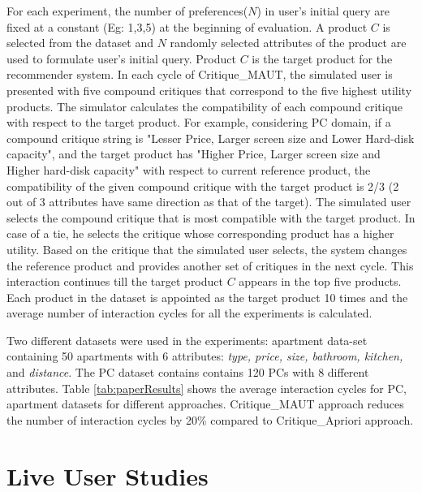 For each experiment, the number of preferences($N$) in user's initial query are fixed at a constant (Eg: 1,3,5) at the beginning of evaluation.
A product $C$ is selected from the dataset and $N$ randomly selected attributes of the product are used to formulate user's initial query.
Product $C$ is the target product for the recommender system.
In each cycle of Critique\_MAUT, the simulated user is presented with five compound critiques that correspond to the five highest utility products.
The simulator calculates the compatibility of each compound critique with respect to the target product.
For example, considering PC domain, if a compound critique string is "Lesser Price, Larger screen size and Lower Hard-disk capacity", and the target product has "Higher Price, Larger screen size and Higher hard-disk capacity" with respect to current reference product, the compatibility of the given compound critique with the target product is 2/3 (2 out of 3 attributes have same direction as that of the target).
The simulated user selects the compound critique that is most compatible with the target product.
In case of a tie, he selects the critique whose corresponding product has a higher utility.
Based on the critique that the simulated user selects, the system changes the reference product and provides another set of critiques in the next cycle.
This interaction continues till the target product $C$ appears in the top five products.
Each product in the dataset is appointed as the target product 10 times and the average number of interaction cycles for all the experiments is calculated.

Two different datasets were used in the experiments: apartment data-set containing 50 apartments with 6 attributes: \textit{type, price, size, bathroom, kitchen,} and \textit{distance}.
The PC dataset contains contains 120 PCs with 8 different attributes. 
Table \ref{tab:paperResults} shows the average interaction cycles for PC, apartment datasets for different approaches.
Critique\_MAUT approach reduces the number of interaction cycles by 20\% compared to Critique\_Apriori approach.


\section{Live User Studies}
\label{sec:liveUser}


